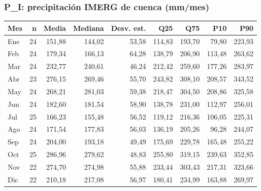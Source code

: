 \documentclass[10pt,a4paper]{article}
\begin{document}
\subsubsection*{P\_I: precipitación IMERG de cuenca (mm/mes)}
\begin{center}\small\begin{tabular}{lrrrrrrrr}\hline
Mes & n & Media & Mediana & Desv. est. & Q25 & Q75 & P10 & P90 \\\hline
Ene & 24 & 151,88 & 144,02 & 53,58 & 114,83 & 193,70 & 79,80 & 223,93\\
Feb & 24 & 179,34 & 166,13 & 64,28 & 138,79 & 206,90 & 113,48 & 263,62\\
Mar & 24 & 232,77 & 240,61 & 46,24 & 212,42 & 259,60 & 177,26 & 283,97\\
Abr & 23 & 276,15 & 269,46 & 55,70 & 243,82 & 308,10 & 208,57 & 343,52\\
May & 24 & 268,21 & 281,03 & 59,38 & 218,47 & 304,50 & 208,86 & 325,58\\
Jun & 24 & 182,60 & 181,54 & 58,90 & 138,78 & 231,00 & 112,97 & 256,01\\
Jul & 25 & 166,23 & 155,48 & 56,52 & 119,12 & 216,36 & 106,05 & 225,31\\
Ago & 24 & 171,54 & 177,83 & 56,03 & 136,19 & 205,26 & 96,28 & 244,07\\
Sep & 24 & 204,00 & 193,18 & 49,49 & 175,69 & 229,78 & 165,48 & 255,22\\
Oct & 25 & 286,96 & 279,62 & 48,83 & 255,80 & 319,15 & 239,63 & 352,85\\
Nov & 22 & 274,70 & 274,98 & 55,88 & 233,44 & 303,43 & 217,31 & 323,66\\
Dic & 22 & 210,18 & 217,08 & 56,97 & 180,41 & 234,99 & 163,88 & 269,97\\
\hline\end{tabular}\end{center}
\end{document}
